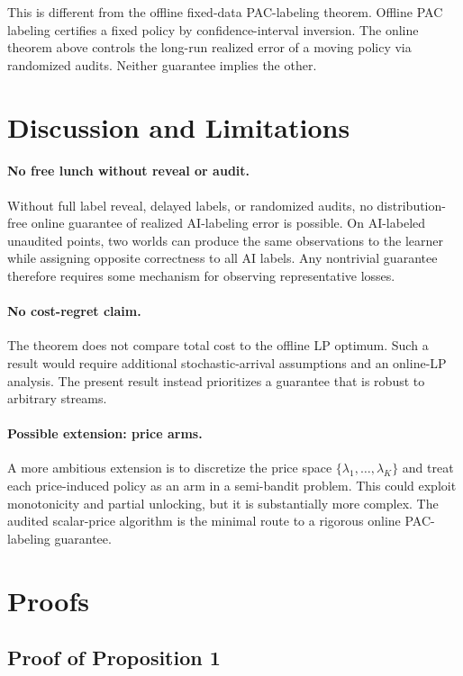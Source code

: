 \documentclass[11pt]{article}
\newcommand{\1}{\mathbf{1}}
\begin{document}
This is different from the offline fixed-data PAC-labeling theorem. Offline PAC labeling certifies a fixed policy by confidence-interval inversion. The online theorem above controls the long-run realized error of a moving policy via randomized audits. Neither guarantee implies the other.

\section{Discussion and Limitations}

\paragraph{No free lunch without reveal or audit.}
Without full label reveal, delayed labels, or randomized audits, no distribution-free online guarantee of realized AI-labeling error is possible. On AI-labeled unaudited points, two worlds can produce the same observations to the learner while assigning opposite correctness to all AI labels. Any nontrivial guarantee therefore requires some mechanism for observing representative losses.

\paragraph{No cost-regret claim.}
The theorem does not compare total cost to the offline LP optimum. Such a result would require additional stochastic-arrival assumptions and an online-LP analysis. The present result instead prioritizes a guarantee that is robust to arbitrary streams.

\paragraph{Possible extension: price arms.}
A more ambitious extension is to discretize the price space $\{\lambda_1,\ldots,\lambda_K\}$ and treat each price-induced policy as an arm in a semi-bandit problem. This could exploit monotonicity and partial unlocking, but it is substantially more complex. The audited scalar-price algorithm is the minimal route to a rigorous online PAC-labeling guarantee.

\appendix

\section{Proofs}

\subsection{Proof of Proposition 1}
\end{document}
